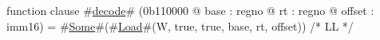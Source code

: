 function clause #\hyperref[zdecode]{decode}# (0b110000 @ base : regno @ rt : regno @ offset : imm16) =
  #\hyperref[zSome]{Some}#(#\hyperref[zLoad]{Load}#(W, true,  true, base, rt, offset))  /* LL */
